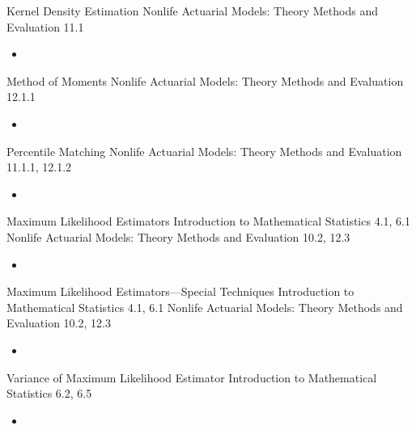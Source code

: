 \documentclass[12pt, titlepage, french]{report}
\begin{document}
\begin{CHPT_SUMM_AUTO_NUMB}[label = {L.-26}]{Kernel Density Estimation}
Nonlife Actuarial Models: Theory Methods and Evaluation 11.1
	\begin{itemize}
		\item	
	\end{itemize}
\end{CHPT_SUMM_AUTO_NUMB}

\begin{CHPT_SUMM_AUTO_NUMB}[label = {L.-27}]{Method of Moments}
Nonlife Actuarial Models: Theory Methods and Evaluation 12.1.1
	\begin{itemize}
		\item	
	\end{itemize}
\end{CHPT_SUMM_AUTO_NUMB}

\begin{CHPT_SUMM_AUTO_NUMB}[label = {L.-28}]{Percentile Matching}
Nonlife Actuarial Models: Theory Methods and Evaluation 11.1.1, 12.1.2
	\begin{itemize}
		\item	
	\end{itemize}
\end{CHPT_SUMM_AUTO_NUMB}

\begin{CHPT_SUMM_AUTO_NUMB}[label = {L.-29}]{Maximum Likelihood Estimators}
Introduction to Mathematical Statistics 4.1, 6.1
Nonlife Actuarial Models: Theory Methods and Evaluation 10.2, 12.3
	\begin{itemize}
		\item	
	\end{itemize}
\end{CHPT_SUMM_AUTO_NUMB}

\begin{CHPT_SUMM_AUTO_NUMB}[label = {L.-30}]{Maximum Likelihood Estimators---Special Techniques}
Introduction to Mathematical Statistics 4.1, 6.1
Nonlife Actuarial Models: Theory Methods and Evaluation 10.2, 12.3
	\begin{itemize}
		\item	
	\end{itemize}
\end{CHPT_SUMM_AUTO_NUMB}

\begin{CHPT_SUMM_AUTO_NUMB}[label = {L.-31}]{Variance of Maximum Likelihood Estimator}
Introduction to Mathematical Statistics 6.2, 6.5
	\begin{itemize}
		\item	
	\end{itemize}
\end{CHPT_SUMM_AUTO_NUMB}
\end{document}
